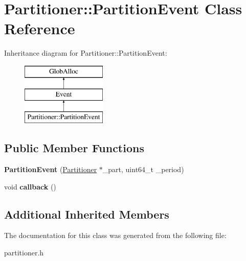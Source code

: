 \hypertarget{classPartitioner_1_1PartitionEvent}{\section{Partitioner\-:\-:Partition\-Event Class Reference}
\label{classPartitioner_1_1PartitionEvent}
}
Inheritance diagram for Partitioner\-:\-:Partition\-Event\-:\begin{figure}[H]
\begin{center}
\leavevmode
\includegraphics[height=3.000000cm]{classPartitioner_1_1PartitionEvent}
\end{center}
\end{figure}
\subsection*{Public Member Functions}
\begin{DoxyCompactItemize}
\item 
\hypertarget{classPartitioner_1_1PartitionEvent_a278b04cf2f7cee7d0a9811a67fb0aa68}{{\bfseries Partition\-Event} (\hyperlink{classPartitioner}{Partitioner} $\ast$\-\_\-part, uint64\-\_\-t \-\_\-period)}\label{classPartitioner_1_1PartitionEvent_a278b04cf2f7cee7d0a9811a67fb0aa68}

\item 
\hypertarget{classPartitioner_1_1PartitionEvent_a3044e46efce3cf81b0c20aa21584675b}{void {\bfseries callback} ()}\label{classPartitioner_1_1PartitionEvent_a3044e46efce3cf81b0c20aa21584675b}

\end{DoxyCompactItemize}
\subsection*{Additional Inherited Members}


The documentation for this class was generated from the following file\-:\begin{DoxyCompactItemize}
\item 
partitioner.\-h\end{DoxyCompactItemize}
